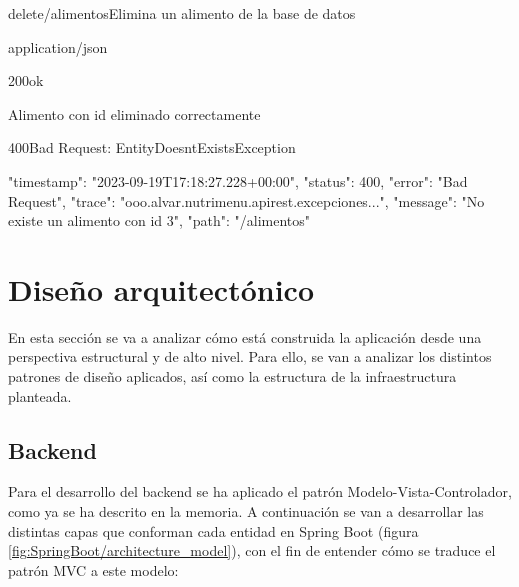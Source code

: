 \begin{table}[b]
\begin{apiRoute}{delete}{/alimentos}{Elimina un alimento de la base de datos}
	\begin{routeParameter}
	\end{routeParameter}
	\begin{routeResponse}{application/json}
		\begin{routeResponseItem}{200}{ok}
			\begin{routeResponseItemBody}
Alimento con id eliminado correctamente	
			\end{routeResponseItemBody}
		\end{routeResponseItem}
		
	\begin{routeResponseItem}{400}{Bad Request: EntityDoesntExistsException}
			\begin{routeResponseItemBody}
{
    "timestamp": "2023-09-19T17:18:27.228+00:00",
    "status": 400,
    "error": "Bad Request",
    "trace": "ooo.alvar.nutrimenu.apirest.excepciones...",
    "message": "No existe un alimento con id 3",
    "path": "/alimentos"
}
			\end{routeResponseItemBody}
		\end{routeResponseItem}
		
	\end{routeResponse}
\end{apiRoute}
\caption{Endpoint que permite eliminar un alimento}
\end{table}

\section{Diseño arquitectónico}


En esta sección se va a analizar cómo está construida la aplicación desde una perspectiva estructural y de alto nivel. Para ello, se van a analizar los distintos patrones de diseño aplicados, así como la estructura de la infraestructura planteada. 

\subsection{Backend}

Para el desarrollo del backend se ha aplicado el patrón Modelo-Vista-Controlador, como ya se ha descrito en la memoria. A continuación se van a desarrollar las distintas capas que conforman cada entidad en Spring Boot (figura \ref{fig:SpringBoot/architecture_model}), con el fin de entender cómo se traduce el patrón MVC a este modelo:

